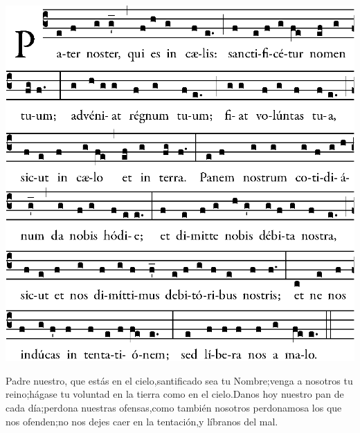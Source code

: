 \begin{center}
\includegraphics[width=.9\textwidth]{src/ordinario/pater.eps}
\end{center}

\be Padre nuestro, que estás en el cielo,\redast santificado sea tu Nombre;\redast venga a nosotros tu reino;\redast hágase tu voluntad en la tierra como en el cielo.\redast Danos hoy nuestro pan de cada día;\redast perdona nuestras ofensas,\redast como también nosotros perdonamos\redast a los que nos ofenden;\redast no nos dejes caer en la tentación,\redast y líbranos del mal.
